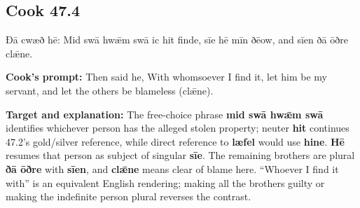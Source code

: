 \par\begin{minipage}{\linewidth}\raggedright
\subsection*{Cook 47.4}

Ðā cwæð hē: Mid swā hwǣm swā ic hit finde, sīe hē mīn ðēow, and sīen ðā ōðre clǣne.

\textbf{Cook’s prompt:} Then said he, With whomsoever I find it, let him be my servant, and let the others be blameless (clǣne).

\textbf{Target and explanation:} The free-choice phrase \textbf{mid swā hwǣm swā} identifies whichever person has the alleged stolen property; neuter \textbf{hit} continues 47.2’s gold/\allowbreak{}silver reference, while direct reference to \textbf{læfel} would use \textbf{hine}. \textbf{Hē} resumes that person as subject of singular \textbf{sīe}. The remaining brothers are plural \textbf{ðā ōðre} with \textbf{sīen}, and \textbf{clǣne} means clear of blame here. “Whoever I find it with” is an equivalent English rendering; making all the brothers guilty or making the indefinite person plural reverses the contrast.

\end{minipage}\par\addvspace{4pt}

